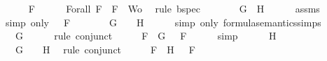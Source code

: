 \begin{isabellebody}
\ \ \isamarkupfalse%
\ {\isachardoublequoteopen}{\isasymA}\ {\isasymTurnstile}\ F{\isachardoublequoteclose}\isanewline
\ \ \ \ \isamarkupfalse%
\ Forall{}\ {\isacartoucheopen}F\ {\isasymin}\ {\isacharbraceleft}F{\isacharbraceright}\ {\isasymunion}\ Wo{\isacartoucheclose}\ \isamarkupfalse%
\ {\isacharparenleft}rule\ bspec{\isacharparenright}\isanewline
\ \ \isamarkupfalse%
\ \isamarkupfalse%
\ {\isachardoublequoteopen}{\isasymA}\ {\isasymTurnstile}\ {\isacharparenleft}G\ \isactrlbold {\isasymand}\ H{\isacharparenright}{\isachardoublequoteclose}\isanewline
\ \ \ \ \isamarkupfalse%
\ assms{\isacharparenleft}{}{\isacharparenright}\ \isamarkupfalse%
\ {\isacharparenleft}simp\ only{\isacharcolon}\ {\isacartoucheopen}{\isasymA}\ {\isasymTurnstile}\ F{\isacartoucheclose}{\isacharparenright}\isanewline
\ \ \isamarkupfalse%
\ \isamarkupfalse%
\ {\isachardoublequoteopen}{\isasymA}\ {\isasymTurnstile}\ G\ {\isasymand}\ {\isasymA}\ {\isasymTurnstile}\ H{\isachardoublequoteclose}\isanewline
\ \ \ \ \isamarkupfalse%
\ {\isacharparenleft}simp\ only{\isacharcolon}\ formula{\isacharunderscore}semantics{\isachardot}simps{\isacharparenleft}{}{\isacharparenright}{\isacharparenright}\isanewline
\ \ \isamarkupfalse%
\ \isamarkupfalse%
\ {\isachardoublequoteopen}{\isasymA}\ {\isasymTurnstile}\ G{\isachardoublequoteclose}\isanewline
\ \ \ \ \isamarkupfalse%
\ {\isacharparenleft}rule\ conjunct{}{\isacharparenright}\isanewline
\ \ \isamarkupfalse%
\ \isamarkupfalse%
\ {}{\isacharcolon}{\isachardoublequoteopen}{\isasymforall}F\ {\isasymin}\ {\isacharbraceleft}G{\isacharbraceright}{\isachardot}\ {\isasymA}\ {\isasymTurnstile}\ F{\isachardoublequoteclose}\isanewline
\ \ \ \ \isamarkupfalse%
\ simp\isanewline
\ \ \isamarkupfalse%
\ {\isachardoublequoteopen}{\isasymA}\ {\isasymTurnstile}\ H{\isachardoublequoteclose}\isanewline
\ \ \ \ \isamarkupfalse%
\ {\isacartoucheopen}{\isasymA}\ {\isasymTurnstile}\ G\ {\isasymand}\ {\isasymA}\ {\isasymTurnstile}\ H{\isacartoucheclose}\ \isamarkupfalse%
\ {\isacharparenleft}rule\ conjunct{}{\isacharparenright}\isanewline
\ \ \isamarkupfalse%
\ \isamarkupfalse%
\ {}{\isacharcolon}{\isachardoublequoteopen}{\isasymforall}F\ {\isasymin}\ {\isacharbraceleft}H{\isacharbraceright}{\isachardot}\ {\isasymA}\ {\isasymTurnstile}\ F{\isachardoublequoteclose}\isanewline

\end{isabellebody}
